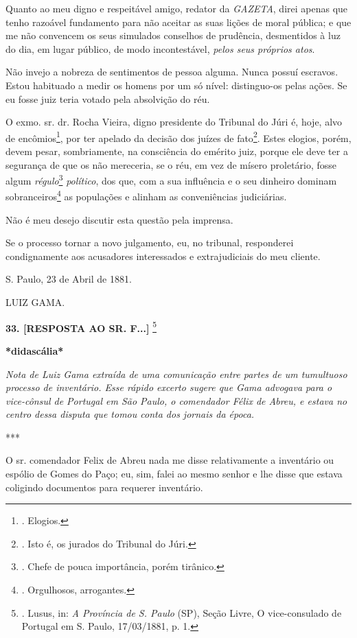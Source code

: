Quanto ao meu digno e respeitável amigo, redator da \emph{GAZETA}, direi
apenas que tenho razoável fundamento para não aceitar as suas lições de
moral pública; e que me não convencem os seus simulados conselhos de
prudência, desmentidos à luz do dia, em lugar público, de modo
incontestável, \emph{pelos seus próprios atos}.

Não invejo a nobreza de sentimentos de pessoa alguma. Nunca possuí
escravos. Estou habituado a medir os homens por um só nível:
distinguo-os pelas ações. Se eu fosse juiz teria votado pela absolvição
do réu.

O exmo. sr. dr. Rocha Vieira, digno presidente do Tribunal do Júri é,
hoje, alvo de encômios\footnote{. Elogios.}, por ter apelado da decisão
dos juízes de fato\footnote{. Isto é, os jurados do Tribunal do Júri.}.
Estes elogios, porém, devem pesar, sombriamente, na consciência do
emérito juiz, porque ele deve ter a segurança de que os não mereceria,
se o réu, em vez de mísero proletário, fosse algum
\emph{régulo}\footnote{. Chefe de pouca importância, porém tirânico.}
\emph{político}, dos que, com a sua influência e o seu dinheiro dominam
sobranceiros\footnote{. Orgulhosos, arrogantes.} as populações e alinham
as conveniências judiciárias.

Não é meu desejo discutir esta questão pela imprensa.

Se o processo tornar a novo julgamento, eu, no tribunal, responderei
condignamente aos acusadores interessados e extrajudiciais do meu
cliente.

S. Paulo, 23 de Abril de 1881.

LUIZ GAMA.

\textbf{33. {[}RESPOSTA AO SR. F...{]}} \footnote{. Lusus, in: \emph{A
  Província de S. Paulo} (SP), Seção Livre, O vice-consulado de Portugal
  em S. Paulo, 17/03/1881, p. 1.}

\textbf{*didascália*}

\emph{Nota de Luiz Gama extraída de uma comunicação entre partes de um
tumultuoso processo de inventário. Esse rápido excerto sugere que Gama
advogava para o vice-cônsul de Portugal em São Paulo, o comendador Félix
de Abreu, e estava no centro dessa disputa que tomou conta dos jornais
da época.}

***

O sr. comendador Felix de Abreu nada me disse relativamente a inventário
ou espólio de Gomes do Paço; eu, sim, falei ao mesmo senhor e lhe disse
que estava coligindo documentos para requerer inventário.

